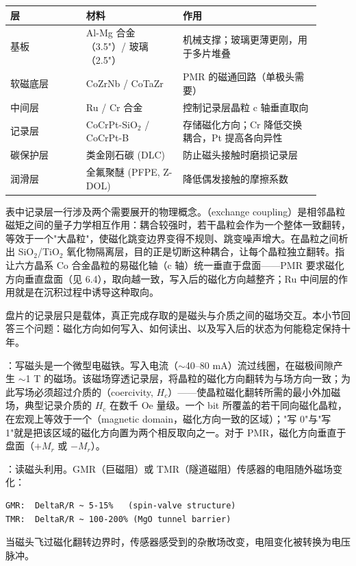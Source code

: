 \begin{longtable}{L{0.22\linewidth}L{0.28\linewidth}L{0.4\linewidth}}
\toprule
层 & 材料 & 作用 \\
\midrule
基板 & Al-Mg 合金（3.5"）/ 玻璃（2.5"） & 机械支撑；玻璃更薄更刚，用于多片堆叠 \\
软磁底层 & CoZrNb / CoTaZr & PMR 的磁通回路（单极头需要） \\
中间层 & Ru / Cr 合金 & 控制记录层晶粒 c 轴垂直取向 \\
记录层 & CoCrPt-SiO$_2$ / CoCrPt-B & 存储磁化方向；Cr 降低交换耦合，Pt 提高各向异性 \\
碳保护层 & 类金刚石碳 (DLC) & 防止磁头接触时磨损记录层 \\
润滑层 & 全氟聚醚 (PFPE, Z-DOL) & 降低偶发接触的摩擦系数 \\
\bottomrule
\end{longtable}

表中记录层一行涉及两个需要展开的物理概念。（exchange coupling）是相邻晶粒磁矩之间的量子力学相互作用：耦合较强时，若干晶粒会作为一个整体一致翻转，等效于一个"大晶粒"，使磁化跳变边界变得不规则、跳变噪声增大。在晶粒之间析出 SiO$_2$/TiO$_2$ 氧化物隔离层，目的正是切断这种耦合，让每个晶粒独立翻转。指让六方晶系 Co 合金晶粒的易磁化轴（c 轴）统一垂直于盘面——PMR 要求磁化方向垂直盘面（见 6.4），取向越一致，写入后的磁化方向越整齐；Ru 中间层的作用就是在沉积过程中诱导这种取向。


盘片的记录层只是载体，真正完成存取的是磁头与介质之间的磁场交互。本小节回答三个问题：磁化方向如何写入、如何读出、以及写入后的状态为何能稳定保持十年。

：写磁头是一个微型电磁铁。写入电流（$\sim$40--80 mA）流过线圈，在磁极间隙产生 $\sim$1 T 的磁场。该磁场穿透记录层，将晶粒的磁化方向翻转为与场方向一致；为此写场必须超过介质的（coercivity, $H_c$）——使晶粒磁化翻转所需的最小外加磁场，典型记录介质的 $H_c$ 在数千 Oe 量级。一个 bit 所覆盖的若干同向磁化晶粒，在宏观上等效于一个（magnetic domain，磁化方向一致的区域）；"写 0"与"写 1"就是把该区域的磁化方向置为两个相反取向之一。对于 PMR，磁化方向垂直于盘面（$+M_r$ 或 $-M_r$）。

：读磁头利用。GMR（巨磁阻）或 TMR（隧道磁阻）传感器的电阻随外磁场变化：

\begin{lstlisting}
GMR:  DeltaR/R ~ 5-15%   (spin-valve structure)
TMR:  DeltaR/R ~ 100-200% (MgO tunnel barrier)
\end{lstlisting}
当磁头飞过磁化翻转边界时，传感器感受到的杂散场改变，电阻变化被转换为电压脉冲。

